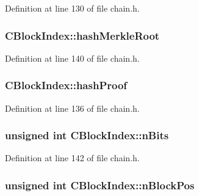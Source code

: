 Definition at line 130 of file chain.\+h.

\hypertarget{class_c_block_index_a0601b6b2bd6eaedfbc283c00d045a21c}{}
\subsubsection[{hash\+Merkle\+Root}]{ C\+Block\+Index\+::hash\+Merkle\+Root}\label{class_c_block_index_a0601b6b2bd6eaedfbc283c00d045a21c}


Definition at line 140 of file chain.\+h.

\hypertarget{class_c_block_index_a553e6fc301e8130118d7ec68dce91ee9}{}
\subsubsection[{hash\+Proof}]{ C\+Block\+Index\+::hash\+Proof}\label{class_c_block_index_a553e6fc301e8130118d7ec68dce91ee9}


Definition at line 136 of file chain.\+h.

\hypertarget{class_c_block_index_a3324894e6af612d1bd76f89378435713}{}
\subsubsection[{n\+Bits}]{\setlength{\rightskip}{0pt plus 5cm}unsigned int C\+Block\+Index\+::n\+Bits}\label{class_c_block_index_a3324894e6af612d1bd76f89378435713}


Definition at line 142 of file chain.\+h.

\hypertarget{class_c_block_index_af8de5426e2da2c78e1e7729a89a7670a}{}
\subsubsection[{n\+Block\+Pos}]{\setlength{\rightskip}{0pt plus 5cm}unsigned int C\+Block\+Index\+::n\+Block\+Pos}\label{class_c_block_index_af8de5426e2da2c78e1e7729a89a7670a}


